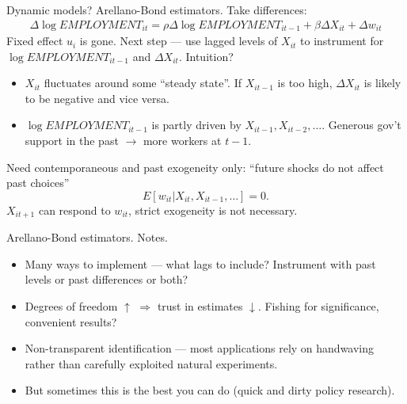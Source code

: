\documentclass[notes=show,beamer,compress]{beamer}
\begin{document}
\begin{frame}{Dynamic models? Arellano-Bond estimators.}
Take differences:
\begin{multline*}
\Delta\log{EMPLOYMENT_{it}} = \rho\Delta\log{EMPLOYMENT_{it-1}} + \beta{}\Delta{}X_{it} + \Delta{}w_{it}
\end{multline*}
Fixed effect $u_i$ is gone. Next step --- use lagged levels of $X_{it}$ to instrument for $\log{EMPLOYMENT_{it-1}}$ and $\Delta{}X_{it}$. Intuition?
\begin{itemize}
	\item{$X_{it}$ fluctuates around some ``steady state''. If $X_{it-1}$ is too high, $\Delta{}X_{it}$ is likely to be negative and vice versa.}
	\item{$\log{EMPLOYMENT_{it-1}}$ is partly driven by $X_{it-1}, X_{it-2}, \dots$. Generous gov't support in the past $\to$ more workers at $t-1$.}
\end{itemize}
Need contemporaneous and past exogeneity only: ``future shocks do not affect past choices''
\begin{equation*}
	E[w_{it}|X_{it}, X_{it-1}, \dots] = 0.
\end{equation*}
$X_{it+1}$ can respond to $w_{it}$, strict exogeneity is not necessary.
\end{frame}

\begin{frame}{Arellano-Bond estimators. Notes.}
\begin{itemize}
	\item{Many ways to implement --- what lags to include? Instrument with past levels or past differences or both?}
	\item{Degrees of freedom $\uparrow$ $\Rightarrow$ trust in estimates $\downarrow$. Fishing for significance, convenient results?}
	\item{Non-transparent identification --- most applications rely on handwaving rather than carefully exploited natural experiments.}
	\item{But sometimes this is the best you can do (quick and dirty policy research).}
\end{itemize}
\end{frame}
\end{document}
